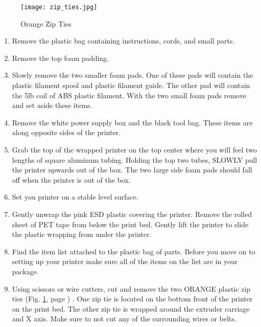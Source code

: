 
\begin{figure}[hbt]
\centering
\texttt{[image: zip\_ties.jpg]}
\caption{Orange Zip Ties}
\label{fig:zip_ties}
\end{figure}

\begin{enumerate}
\item Remove the plastic bag containing instructions, cords, and small parts.

\item Remove the top foam padding. 

\item Slowly remove the two smaller foam pads. One of these pads will contain the plastic filament spool and plastic filament guide. The other pad will contain the 5lb coil of ABS plastic filament. With the two small foam pads remove and set aside these items.

\item Remove the white power supply box and the black tool bag. These items are along opposite sides of the printer.

\item Grab the top of the wrapped printer on the top center where you will feel two lengths of square aluminum tubing. Holding the top two tubes, SLOWLY pull the printer upwards out of the box. The two large side foam pads should fall off when the printer is out of the box.

\item Set you printer on a stable level surface.

\item Gently unwrap the pink ESD plastic covering the printer. Remove the rolled sheet of PET tape from below the print bed. Gently lift the printer to slide the plastic wrapping from under the printer. 

\item Find the item list attached to the plastic bag of parts. Before you move on to setting up your printer make sure all of the items on the list are in your package.

\item Using scissors or wire cutters, cut and remove the two ORANGE plastic zip ties
(Fig. \ref{fig:zip_ties}, page \pageref{fig:zip_ties})
. One zip tie is located on the bottom front of the printer on the print bed. The other zip tie is wrapped around the extruder carriage and X axis. Make sure to not cut any of the surrounding wires or belts.


\end{enumerate}
